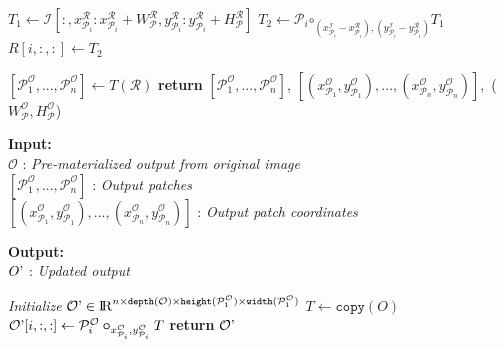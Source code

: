 \begin{algorithm}
\begin{algorithmic}[1]
    \label{alg:line:memcpy_loop}
    	\State $T_1 \gets \mathcal{I}[:,x^\mathcal{R}_{\mathcal{P}_i}:x^\mathcal{R}_{\mathcal{P}_i}+W^\mathcal{R}_\mathcal{P},y^\mathcal{R}_{\mathcal{P}_i}:y^\mathcal{R}_{\mathcal{P}_i}+H^\mathcal{R}_\mathcal{P}]$ 
    	\State $T_2 \gets \mathcal{P}_i \bm\circ_{(x^\mathcal{I}_{\mathcal{P}_i}-x^\mathcal{R}_{\mathcal{P}_i}),(y^\mathcal{I}_{\mathcal{P}_i}-y^\mathcal{R}_{\mathcal{P}_i})} T_1$
    	\State $R[i,:,:] \gets T_2$
    \EndFor

    \State $[\mathcal{P}^\mathcal{O}_1,...,\mathcal{P}^\mathcal{O}_n] \gets T(\mathcal{R})$
    \State \textbf{return} $[\mathcal{P}^\mathcal{O}_1,...,\mathcal{P}^\mathcal{O}_n]$, $[(x^\mathcal{O}_{\mathcal{P}_1},y^\mathcal{O}_{\mathcal{P}_1}),...,(x^\mathcal{O}_{\mathcal{P}_n},y^\mathcal{O}_{\mathcal{P}_n})],$
    \State \hspace*{20mm} ($W^\mathcal{O}_\mathcal{P},H^\mathcal{O}_\mathcal{P}$) 
    \EndProcedure
    \end{algorithmic}

    \vspace*{-2mm}
    \hrulefill
    
    \begin{flushleft}
     \hspace*{4mm} \textbf{Input:}\\
     \hspace*{8mm} $\mathcal{O}$ : \textit{Pre-materialized output from original image}\\
     \hspace*{8mm} $[\mathcal{P}^\mathcal{O}_1,...,\mathcal{P}^\mathcal{O}_n]$ : \textit{Output patches}\\
     \hspace*{8mm} $[(x^\mathcal{O}_{\mathcal{P}_1},y^\mathcal{O}_{\mathcal{P}_1}),...,(x^\mathcal{O}_{\mathcal{P}_n},y^\mathcal{O}_{\mathcal{P}_n})]$ : \textit{Output patch coordinates}\\
    \end{flushleft}

    \begin{flushleft}
     \hspace*{4mm} \textbf{Output:}\\
     \hspace*{8mm} $O\textrm'$ : \textit{Updated output}
    \end{flushleft}
	\begin{algorithmic}[1]
    \State \textit{Initialize} $\mathcal{O}\textrm' \in \mathcal{\rm I\!R}^{n \times \texttt{depth}(\mathcal{O}) \times \texttt{height}(\mathcal{P}^\mathcal{O}_1) \times \texttt{width}(\mathcal{P}^\mathcal{O}_1)}$
    	\State $T \gets \texttt{copy}(O)$
    	\State $\mathcal{O}\textrm'[i,:,:] \gets \mathcal{P}^\mathcal{O}_i \bm\circ_{x^\mathcal{O}_{\mathcal{P}_i},y^\mathcal{O}_{\mathcal{P}_i}} T$
    \EndFor
    \State \textbf{return} $\mathcal{O}\textrm'$
    \EndProcedure

    \end{algorithmic}
\end{algorithm}

